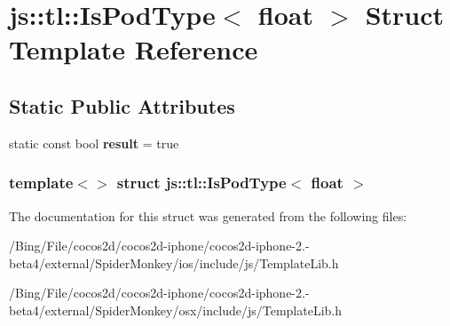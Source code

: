 \hypertarget{structjs_1_1tl_1_1_is_pod_type_3_01float_01_4}{\section{js\-:\-:tl\-:\-:Is\-Pod\-Type$<$ float $>$ Struct Template Reference}
\label{structjs_1_1tl_1_1_is_pod_type_3_01float_01_4}
}
\subsection*{Static Public Attributes}
\begin{DoxyCompactItemize}
\item 
\hypertarget{structjs_1_1tl_1_1_is_pod_type_3_01float_01_4_ae009a2f94cc33f957272cb379d09d741}{static const bool {\bfseries result} = true}\label{structjs_1_1tl_1_1_is_pod_type_3_01float_01_4_ae009a2f94cc33f957272cb379d09d741}

\end{DoxyCompactItemize}
\subsubsection*{template$<$$>$ struct js\-::tl\-::\-Is\-Pod\-Type$<$ float $>$}



The documentation for this struct was generated from the following files\-:\begin{DoxyCompactItemize}
\item 
/\-Bing/\-File/cocos2d/cocos2d-\/iphone/cocos2d-\/iphone-\/2.-\/beta4/external/\-Spider\-Monkey/ios/include/js/Template\-Lib.\-h\item 
/\-Bing/\-File/cocos2d/cocos2d-\/iphone/cocos2d-\/iphone-\/2.-\/beta4/external/\-Spider\-Monkey/osx/include/js/Template\-Lib.\-h\end{DoxyCompactItemize}
